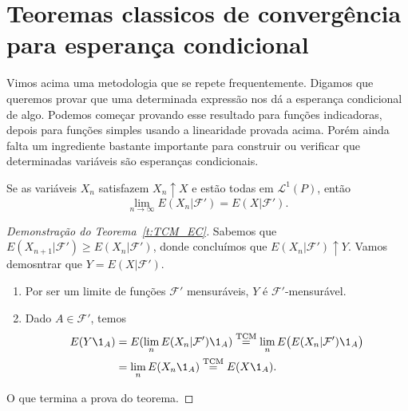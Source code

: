 \section{Teoremas classicos de convergência para esperança condicional}
Vimos acima uma metodologia que se repete frequentemente.
Digamos que queremos provar que uma determinada expressão nos dá a esperança condicional de algo.
Podemos começar provando esse resultado para funções indicadoras, depois para funções simples usando a linearidade provada acima.
Porém ainda falta um ingrediente bastante importante para construir ou verificar que determinadas variáveis são esperanças condicionais.

\begin{theorem}
  \label{t:TCM_EC}
  Se as variáveis $X_n$ satisfazem $X_n \uparrow X$ e estão todas em $\mathcal{L}^1(P)$, então
  \begin{equation}
    \lim_{n\to \infty} E(X_n|\mathcal{F}') = E(X|\mathcal{F}').
  \end{equation}
\end{theorem}

\begin{proof}[Demonstração do Teorema~\ref{t:TCM_EC}]
  Sabemos que $E(X_{n+1} | \mathcal{F}') \geq E(X_n|\mathcal{F}')$, donde concluímos que $E(X_n|\mathcal{F}') \uparrow Y$.
  Vamos demosntrar que $Y = E(X|\mathcal{F}')$.
  \begin{enumerate}[\quad a)]
  \item Por ser um limite de funções $\mathcal{F}'$ mensuráveis, $Y$ é $\mathcal{F}'$-mensurável.
  \item Dado $A \in \mathcal{F}'$, temos
    \begin{equation}
      \begin{split}
        E(Y \1_A) & = E(\lim_n E(X_n |\mathcal{F}') \1_A) \overset{\text{TCM}}= \lim_n E\big( E(X_n|\mathcal{F}') \1_A \big)\\
        & = \lim_n E(X_n \1_A) \overset{\text{TCM}}= E(X \1_A).
      \end{split}
    \end{equation}
  \end{enumerate}
  O que termina a prova do teorema.
\end{proof}









